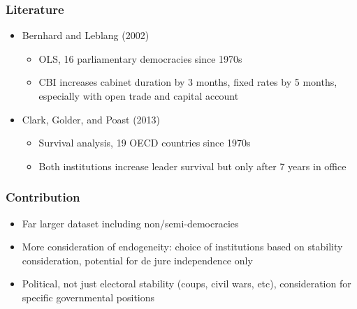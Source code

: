 \documentclass{beamer}
\begin{document}
    \begin{frame}
        \frametitle{Literature}
        \begin{itemize}
            \item Bernhard and Leblang (2002)
            \begin{itemize}
                \item OLS, 16 parliamentary democracies since 1970s
                \item CBI increases cabinet duration by 3 months, fixed rates by 5 months, especially with open trade and capital account
            \end{itemize}
            \item Clark, Golder, and Poast (2013)
            \begin{itemize}
                \item Survival analysis, 19 OECD countries since 1970s
                \item Both institutions increase leader survival but only after 7 years in office
            \end{itemize}
        \end{itemize}
    \end{frame}

    \begin{frame}
        \frametitle{Contribution}
        \begin{itemize}
            \item Far larger dataset including non/semi-democracies
            \item More consideration of endogeneity: choice of institutions based on stability consideration, potential for de jure independence only
            \item Political, not just electoral stability (coups, civil wars, etc), consideration for specific governmental positions
        \end{itemize}
    \end{frame}
\end{document}

